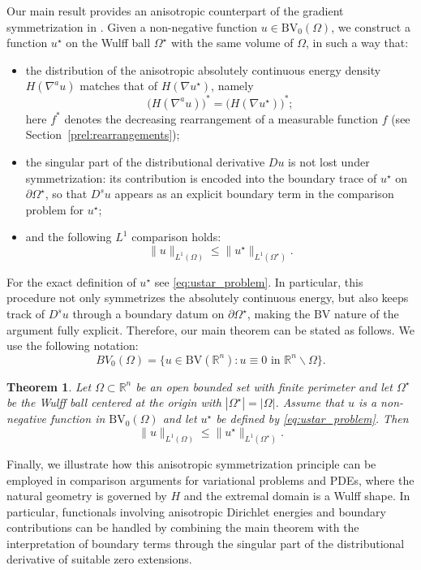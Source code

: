 \documentclass[oneside,a4paper,12pt,notitlepage]{article}
\newtheorem{theorem}{Theorem}[section]
\theoremstyle{definition}
\newcommand{\R}{\mathbb{R}}
\newcommand{\BV}{\text{BV}}
\begin{document}
Our main result provides an anisotropic counterpart of the gradient symmetrization in \cite{AGNT24}.
Given a non-negative function $u\in \BV_0(\Omega)$, we construct a function $u^\star$ on the Wulff
ball $\Omega^\star$  with the same volume of $\Omega$, in such a way that:
\begin{itemize}
\item the distribution of the anisotropic absolutely continuous energy density
\(H(\nabla^a u)\) matches that of \(H(\nabla u^\star)\), namely
\[
\big(H(\nabla^a u)\big)^*
=
\big(H(\nabla u^\star)\big)^*;
\]
here \(f^*\) denotes the decreasing rearrangement of a measurable function \(f\)
(see Section~\ref{prel:rearrangements});
\item the singular part of the distributional derivative $Du$ is not lost under symmetrization:
its contribution is encoded into the boundary trace of $u^\star$ on $\partial\Omega^\star$, so that
$D^s u$ appears as an explicit boundary term in the comparison problem for $u^\star$;
\item and the following $L^1$ comparison holds:
\[
\|u\|_{L^1(\Omega)}\le \|u^\star\|_{L^1(\Omega^\star)}.
\]
\end{itemize}
For the exact definition of $u^{\star}$ see \eqref{eq:ustar_problem}.
In particular, this procedure not only symmetrizes the absolutely continuous energy, but also 
keeps track of $D^s u$ through a boundary datum on $\partial\Omega^\star$, making the $\BV$ nature of
the argument fully explicit.
Therefore, our main theorem can be stated as follows.
We use the following notation:
\[
BV_{0}(\Omega) = \{u \in \BV(\mathbb{R}^n): u \equiv 0 \,\,\mathrm{in}\,\, \mathbb{R}^n\backslash\Omega\}.
\]
\begin{theorem}\label{thm:main_comparison}
Let $\Omega\subset\R^n$ be an open bounded set with finite perimeter and let $\Omega^{\star}$ be the Wulff ball centered at the origin with $|\Omega^\star|=|\Omega|$.
Assume that $u$ is a non-negative function in $\BV_0(\Omega)$ and let $u^\star$ be defined by \eqref{eq:ustar_problem}.
Then
\begin{equation}\label{eq:main_inequality}
\|u\|_{L^1(\Omega)}\le \|u^{\star}\|_{L^1(\Omega^\star)} .
\end{equation}
\end{theorem}


 







Finally, we illustrate how this anisotropic symmetrization principle can be employed in comparison arguments for variational problems and PDEs,
where the natural geometry is governed by $H$ and the extremal domain is a Wulff shape. In particular, functionals involving anisotropic
Dirichlet energies and boundary contributions can be handled by combining the main theorem with the interpretation of boundary terms
through the singular part of the distributional derivative of suitable zero extensions.
\end{document}
